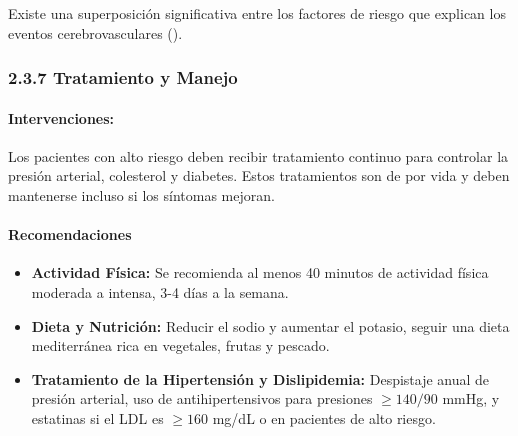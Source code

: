 Existe una superposición significativa entre los factores de riesgo que explican los eventos cerebrovasculares (\cite{sabihstroke}).  


\subsubsection {2.3.7 Tratamiento y Manejo}
\paragraph{Intervenciones: } Los pacientes con alto riesgo deben recibir tratamiento continuo para controlar la presión arterial, colesterol y diabetes. Estos tratamientos son de por vida y deben mantenerse incluso si los síntomas mejoran.


\paragraph{Recomendaciones}
\begin{itemize}
    \item \textbf{Actividad Física:} Se recomienda al menos 40 minutos de actividad física moderada a intensa, 3-4 días a la semana.
    \item \textbf{Dieta y Nutrición:} Reducir el sodio y aumentar el potasio, seguir una dieta mediterránea rica en vegetales, frutas y pescado.
    \item \textbf{Tratamiento de la Hipertensión y Dislipidemia:} Despistaje anual de presión arterial, uso de antihipertensivos para presiones $\geq 140/90$ mmHg, y estatinas si el LDL es $\geq 160$ mg/dL o en pacientes de alto riesgo.
\end{itemize}


